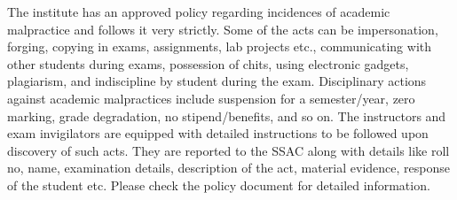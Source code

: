 The \gls{institute} has an approved policy regarding incidences of academic malpractice and follows it very strictly. Some of the acts can be impersonation, forging, copying in exams, assignments, lab projects etc., communicating with other \glspl{student} during exams, possession of chits, using electronic gadgets, plagiarism, and indiscipline by \gls{student} during the exam. Disciplinary actions against academic malpractices include suspension for a semester/year, zero marking, grade degradation, no stipend/benefits, and so on. The instructors and exam invigilators are equipped with detailed instructions to be followed upon discovery of such acts. They are reported to the SSAC along with details like roll no, name, examination details, description of the act, material evidence, response of the \gls{student} etc. Please check the policy document for detailed information. 